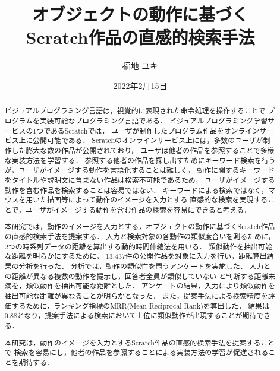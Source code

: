 \documentclass[11pt]{jreport}
\title{オブジェクトの動作に基づく\\
	Scratch作品の直感的検索手法}
\author{福地 ユキ}
\date{2022年2月15日}	%
\begin{document}
\maketitle

\begin{abstract}

ビジュアルプログラミング言語は，視覚的に表現された命令処理を操作することで
プログラムを実装可能なプログラミング言語である．
ビジュアルプログラミング学習サービスの1つであるScratchでは，
ユーザが制作したプログラム作品をオンラインサービス上に公開可能である．
Scratchのオンラインサービス上には，多数のユーザが制作した膨大な数の作品が公開されており，
ユーザは他者の作品を参照することで多様な実装方法を学習する．
参照する他者の作品を探し出すためにキーワード検索を行うが，ユーザがイメージする動作を言語化することは難しく，
動作に関するキーワードをタイトルや説明文に含まない作品は検索不可能であるため，
ユーザがイメージする動作を含む作品を検索することは容易ではない．
キーワードによる検索ではなく，マウスを用いた描画等によって動作のイメージを入力とする
直感的な検索を実現することで，ユーザがイメージする動作を含む作品の検索を容易にできると考える．

本研究では，動作のイメージを入力とする，オブジェクトの動作に基づくScratch作品の直感的検索手法を提案する．
入力と検索対象の各動作の類似度合いを測るために，
2つの時系列データの距離を算出する動的時間伸縮法を用いる．
類似動作を抽出可能な距離を明らかにするために，
13,437件の公開作品を対象に入力を行い，距離算出結果の分析を行った．
分析では，動作の類似性を問うアンケートを実施した．
入力との距離が異なる複数の動作を提示し，回答者全員が類似していない
と判断する距離未満を，類似動作を抽出可能な距離とした．
アンケートの結果，入力により類似動作を抽出可能な距離が異なることが明らかとなった．
また，提案手法による検索精度を評価するために，ランキング指標のMRR(Mean Reciprocal Rank)を算出した．
結果は0.88となり，提案手法による検索において上位に類似動作が出現することが期待できる．

本研究は，動作のイメージを入力とするScratch作品の直感的検索手法を提案することで
検索を容易にし，他者の作品を参照することによる実装方法の学習が促進されることを期待する．

\end{abstract}

\tableofcontents


\end{document}
